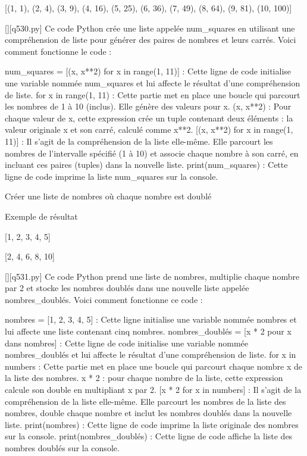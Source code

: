 [(1, 1), (2, 4), (3, 9), (4, 16), (5, 25), (6, 36), (7, 49), (8, 64), (9, 81), (10, 100)]
        \par
        \begin{solution}
            \renewcommand{\nomfichier}{q530.py}
            \pythonfile{\chemincode \nomfichier}[][\nomfichier]
            Ce code Python crée une liste appelée num\_squares en utilisant une compréhension de liste pour générer des paires de nombres et leurs carrés. Voici comment fonctionne le code :

    num\_squares = [(x, x**2) for x in range(1, 11)] : Cette ligne de code initialise une variable nommée num\_squares et lui affecte le résultat d'une compréhension de liste.
        for x in range(1, 11) : Cette partie met en place une boucle qui parcourt les nombres de 1 à 10 (inclus). Elle génère des valeurs pour x.
        (x, x**2) : Pour chaque valeur de x, cette expression crée un tuple contenant deux éléments : la valeur originale x et son carré, calculé comme x**2.
        [(x, x**2) for x in range(1, 11)] : Il s'agit de la compréhension de la liste elle-même. Elle parcourt les nombres de l'intervalle spécifié (1 à 10) et associe chaque nombre à son carré, en incluant ces paires (tuples) dans la nouvelle liste.
    print(num\_squares) : Cette ligne de code imprime la liste num\_squares sur la console.
        \end{solution}
        

        \question
        Créer une liste de nombres où chaque nombre est doublé

Exemple de résultat

[1, 2, 3, 4, 5]

[2, 4, 6, 8, 10]
        \par
        \begin{solution}
            \renewcommand{\nomfichier}{q531.py}
            \pythonfile{\chemincode \nomfichier}[][\nomfichier]
            Ce code Python prend une liste de nombres, multiplie chaque nombre par 2 et stocke les nombres doublés dans une nouvelle liste appelée nombres\_doublés. Voici comment fonctionne ce code :

    nombres = [1, 2, 3, 4, 5] : Cette ligne initialise une variable nommée nombres et lui affecte une liste contenant cinq nombres.
    nombres\_doublés = [x * 2 pour x dans nombres] : Cette ligne de code initialise une variable nommée nombres\_doublés et lui affecte le résultat d'une compréhension de liste.
        for x in numbers : Cette partie met en place une boucle qui parcourt chaque nombre x de la liste des nombres.
        x * 2 : pour chaque nombre de la liste, cette expression calcule son double en multipliant x par 2.
        [x * 2 for x in numbers] : Il s'agit de la compréhension de la liste elle-même. Elle parcourt les nombres de la liste des nombres, double chaque nombre et inclut les nombres doublés dans la nouvelle liste.
    print(nombres) : Cette ligne de code imprime la liste originale des nombres sur la console.
    print(nombres\_doublés) : Cette ligne de code affiche la liste des nombres doublés sur la console.
        \end{solution}
        

